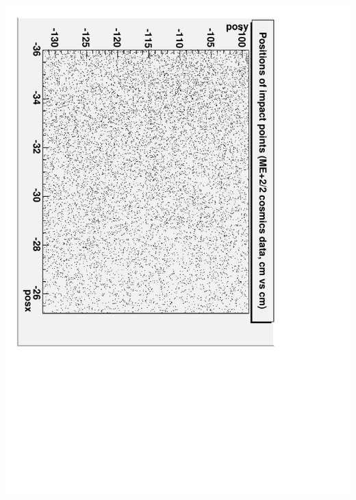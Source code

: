 \documentclass[compress]{beamer}
\begin{document}
\begin{frame}
\begin{columns}
\includegraphics[height=\linewidth, angle=90]{data_impact-points_ME22.pdf}
\end{columns}
\end{frame}
\end{document}
